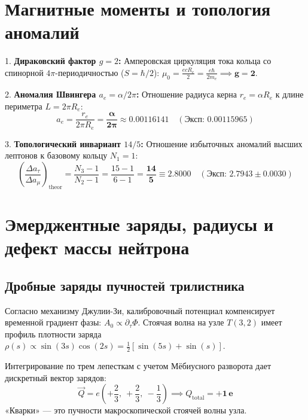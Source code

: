 \documentclass[12pt,a4paper]{article}
\begin{document}
	\section{Магнитные моменты и топология аномалий}
	
	1. \textbf{Дираковский фактор $g=2$:} Амперовская циркуляция тока кольца со спинорной $4\pi$-периодичностью ($S=\hbar/2$): $\mu_0 = \frac{ecR_e}{2} = \frac{e\hbar}{2m_e} \implies \mathbf{g=2}$.
	
	2. \textbf{Аномалия Швингера $a_e = \alpha/2\pi$:} Отношение радиуса керна $r_e = \alpha R_e$ к длине периметра $L = 2\pi R_e$:
	\begin{equation}
		a_e = \frac{r_e}{2\pi R_e} = \mathbf{\frac{\alpha}{2\pi}} \approx \mathbf{0.00116141} \quad (\text{Эксп: } 0.00115965)
	\end{equation}
	
	3. \textbf{Топологический инвариант $14/5$:} Отношение избыточных аномалий высших лептонов к базовому кольцу $N_1=1$:
	\begin{equation}
		\left( \frac{\Delta a_\tau}{\Delta a_\mu} \right)_{\text{theor}} = \frac{N_3 - 1}{N_2 - 1} = \frac{15 - 1}{6 - 1} = \mathbf{\frac{14}{5} \equiv 2.8000} \quad (\text{Эксп: } 2.7943 \pm 0.0030)
	\end{equation}
	
	\section{Эмерджентные заряды, радиусы и дефект массы нейтрона}
	
	\subsection{Дробные заряды пучностей трилистника}
	Согласно механизму Джулии-Зи, калибровочный потенциал компенсирует временной градиент фазы: $A_0 \propto \partial_\tau \Phi$. Стоячая волна на узле $T(3,2)$ имеет профиль плотности заряда $\rho(s) \propto \sin(3s)\cos(2s) = \frac{1}{2}[\sin(5s) + \sin(s)]$.
	
	Интегрирование по трем лепесткам с учетом Мёбиусного разворота дает дискретный вектор зарядов:
	\begin{equation}
		\vec{Q} = e \left( +\frac{2}{3}, \ +\frac{2}{3}, \ -\frac{1}{3} \right) \implies Q_{\text{total}} = \mathbf{+1 \, e}
	\end{equation}
	«Кварки» — это пучности макроскопической стоячей волны узла.
	
\end{document}
